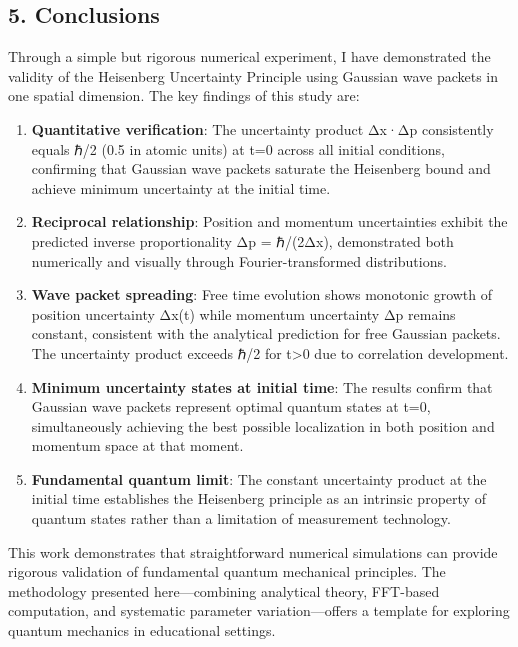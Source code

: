 \documentclass[
]{article}
\begin{document}
\subsection{5. Conclusions}\label{conclusions}

Through a simple but rigorous numerical experiment, I have demonstrated
the validity of the Heisenberg Uncertainty Principle using Gaussian wave
packets in one spatial dimension. The key findings of this study are:

\begin{enumerate}
\def\labelenumi{\arabic{enumi}.}
\item
  \textbf{Quantitative verification}: The uncertainty product Δx·Δp
  consistently equals ℏ/2 (0.5 in atomic units) at t=0 across all
  initial conditions, confirming that Gaussian wave packets saturate the
  Heisenberg bound and achieve minimum uncertainty at the initial time.
\item
  \textbf{Reciprocal relationship}: Position and momentum uncertainties
  exhibit the predicted inverse proportionality Δp = ℏ/(2Δx),
  demonstrated both numerically and visually through Fourier-transformed
  distributions.
\item
  \textbf{Wave packet spreading}: Free time evolution shows monotonic
  growth of position uncertainty Δx(t) while momentum uncertainty Δp
  remains constant, consistent with the analytical prediction for free
  Gaussian packets. The uncertainty product exceeds ℏ/2 for
  t\textgreater0 due to correlation development.
\item
  \textbf{Minimum uncertainty states at initial time}: The results
  confirm that Gaussian wave packets represent optimal quantum states at
  t=0, simultaneously achieving the best possible localization in both
  position and momentum space at that moment.
\item
  \textbf{Fundamental quantum limit}: The constant uncertainty product
  at the initial time establishes the Heisenberg principle as an
  intrinsic property of quantum states rather than a limitation of
  measurement technology.
\end{enumerate}

This work demonstrates that straightforward numerical simulations can
provide rigorous validation of fundamental quantum mechanical
principles. The methodology presented here---combining analytical
theory, FFT-based computation, and systematic parameter
variation---offers a template for exploring quantum mechanics in
educational settings.
\end{document}
